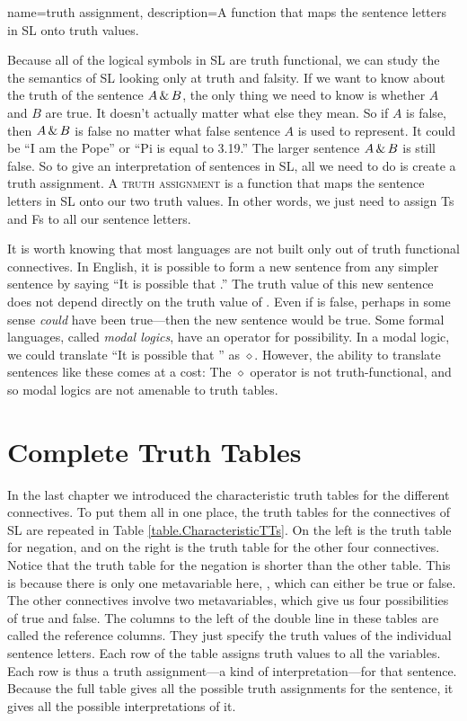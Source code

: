 {
name=truth assignment,
description={A function that maps the sentence letters in SL onto truth values.}
}

Because all of the logical symbols in SL are truth functional, we can study the the semantics of SL looking only at truth and falsity. If we want to know about the truth of the sentence $A \,\&\, B$, the only thing we need to know is whether $A$ and $B$ are true. It doesn't actually matter what else they mean. So if $A$ is false, then $A \,\&\, B$ is false no matter what false sentence $A$ is used to represent. It could be ``I am the Pope'' or ``Pi is equal to 3.19.'' The larger sentence $A \,\&\, B$ is still false. So to give an interpretation of sentences in SL, all we need to do is create a truth assignment. A \textsc{\gls{truth assignment}} \label{def:truth_assignment} is a function that maps the sentence letters in SL onto our two truth values. In other words, we just need to assign Ts and Fs to all our sentence letters.

It is worth knowing that most languages are not built only out of truth functional connectives. In English, it is possible to form a new sentence from any simpler sentence  by saying ``It is possible that .'' The truth value of this new sentence does not depend directly on the truth value of . Even if  is false, perhaps in some sense  \emph{could} have been true---then the new sentence would be true. Some formal languages, called \emph{modal logics}, have an operator for possibility. In a modal logic, we could translate ``It is possible that '' as {\large $\diamond$}. However, the ability to translate sentences like these comes at a cost: The {\large $\diamond$} operator is not truth-functional, and so modal logics are not amenable to truth tables.

\section{Complete Truth Tables}

In the last chapter we introduced the characteristic truth tables for the different connectives. To put them all in one place, the truth tables for the connectives of SL are repeated in Table \ref{table.CharacteristicTTs}. On the left is the truth table for negation, and on the right is the truth table for the other four connectives. Notice that the truth table for the negation is shorter than the other table. This is because there is only one metavariable here, , which can either be true or false. The other connectives involve two metavariables, which give us four possibilities of true and false. The columns to the left of the double line in these tables are called the reference columns. They just specify the truth values of the individual sentence letters. Each row of the table assigns truth values to all the variables. Each row is thus a truth assignment---a kind of interpretation---for that sentence. Because the full table gives all the possible truth assignments for the sentence, it gives all the possible interpretations of it. 


